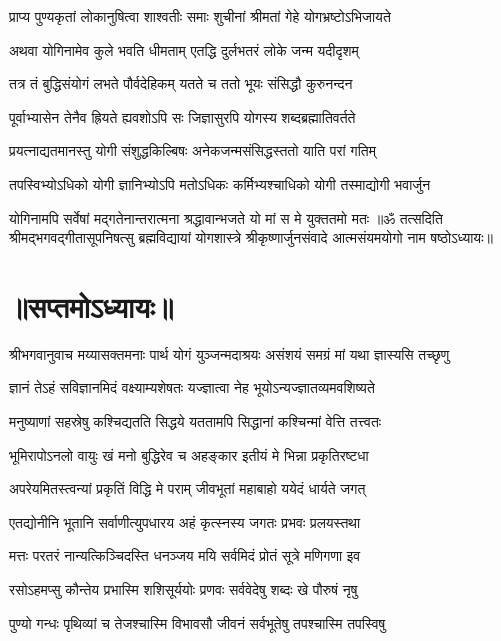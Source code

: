 \twolineshloka
{प्राप्य पुण्यकृतां लोकानुषित्वा शाश्वतीः समाः}
{शुचीनां श्रीमतां गेहे योगभ्रष्टोऽभिजायते}%

\twolineshloka
{अथवा योगिनामेव कुले भवति धीमताम्}
{एतद्धि दुर्लभतरं लोके जन्म यदीदृशम्}%

\twolineshloka
{तत्र तं बुद्धिसंयोगं लभते पौर्वदेहिकम्}
{यतते च ततो भूयः संसिद्धौ कुरुनन्दन}%

\twolineshloka
{पूर्वाभ्यासेन तेनैव ह्रियते ह्यवशोऽपि सः}
{जिज्ञासुरपि योगस्य शब्दब्रह्मातिवर्तते}%

\twolineshloka
{प्रयत्नाद्यतमानस्तु योगी संशुद्धकिल्बिषः}
{अनेकजन्मसंसिद्धस्ततो याति परां गतिम्}%

\twolineshloka
{तपस्विभ्योऽधिको योगी ज्ञानिभ्योऽपि मतोऽधिकः}
{कर्मिभ्यश्चाधिको योगी तस्माद्योगी भवार्जुन}%

\twolineshloka
{योगिनामपि सर्वेषां मद्गतेनान्तरात्मना}
{श्रद्धावान्भजते यो मां स मे युक्ततमो मतः}%
{॥ॐ तत्सदिति श्रीमद्भगवद्गीतासूपनिषत्सु ब्रह्मविद्यायां योगशास्त्रे श्रीकृष्णार्जुनसंवादे आत्मसंयमयोगो नाम षष्ठोऽध्यायः॥}

\section{॥सप्तमोऽध्यायः॥}
{श्रीभगवानुवाच}
\twolineshloka
{मय्यासक्तमनाः पार्थ योगं युञ्जन्मदाश्रयः}
{असंशयं समग्रं मां यथा ज्ञास्यसि तच्छृणु}%

\twolineshloka
{ज्ञानं तेऽहं सविज्ञानमिदं वक्ष्याम्यशेषतः}
{यज्ज्ञात्वा नेह भूयोऽन्यज्ज्ञातव्यमवशिष्यते}%

\twolineshloka
{मनुष्याणां सहस्रेषु कश्चिद्यतति सिद्धये}
{यततामपि सिद्धानां कश्चिन्मां वेत्ति तत्त्वतः}%

\twolineshloka
{भूमिरापोऽनलो वायुः खं मनो बुद्धिरेव च}
{अहङ्कार इतीयं मे भिन्ना प्रकृतिरष्टधा}%

\twolineshloka
{अपरेयमितस्त्वन्यां प्रकृतिं विद्धि मे पराम्}
{जीवभूतां महाबाहो ययेदं धार्यते जगत्}%

\twolineshloka
{एतद्योनीनि भूतानि सर्वाणीत्युपधारय}
{अहं कृत्स्नस्य जगतः प्रभवः प्रलयस्तथा}%

\twolineshloka
{मत्तः परतरं नान्यत्किञ्चिदस्ति धनञ्जय}
{मयि सर्वमिदं प्रोतं सूत्रे मणिगणा इव}%

\twolineshloka
{रसोऽहमप्सु कौन्तेय प्रभास्मि शशिसूर्ययोः}
{प्रणवः सर्ववेदेषु शब्दः खे पौरुषं नृषु}%

\twolineshloka
{पुण्यो गन्धः पृथिव्यां च तेजश्चास्मि विभावसौ}
{जीवनं सर्वभूतेषु तपश्चास्मि तपस्विषु}%

